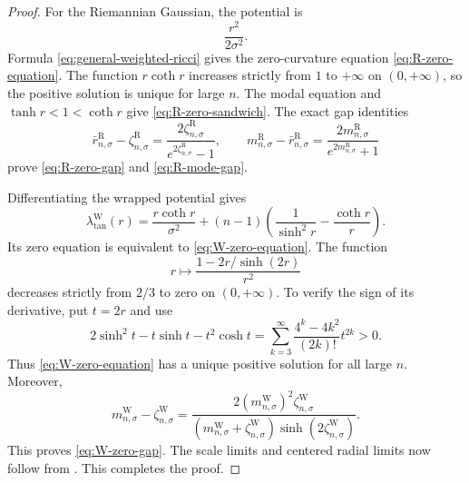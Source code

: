 \documentclass[10pt,a4paper]{amsart}
\begin{document}
\begin{proof}
	For the Riemannian Gaussian, the potential is
	\[
		\frac{r^2}{2\sigma^2}.
	\]
	Formula \eqref{eq:general-weighted-ricci} gives the zero-curvature equation
	\eqref{eq:R-zero-equation}.  The function $r\coth r$ increases strictly
	from $1$ to $+\infty$ on $(0,+\infty)$, so the positive solution is
	unique for large $n$.  The modal equation and
	$\tanh r<1<\coth r$ give \eqref{eq:R-zero-sandwich}.  The exact gap
	identities
	\[
		\bar r^{\mathrm R}_{n,\sigma}
		-\zeta^{\mathrm R}_{n,\sigma}
		=
		\frac{2\zeta^{\mathrm R}_{n,\sigma}}
		{e^{2\zeta^{\mathrm R}_{n,\sigma}}-1},
		\qquad
		m^{\mathrm R}_{n,\sigma}
		-\bar r^{\mathrm R}_{n,\sigma}
		=
		\frac{2m^{\mathrm R}_{n,\sigma}}
		{e^{2m^{\mathrm R}_{n,\sigma}}+1}
	\]
	prove \eqref{eq:R-zero-gap} and \eqref{eq:R-mode-gap}.

	Differentiating the wrapped potential gives
	\[
		\lambda^{\mathrm W}_{\mathrm{tan}}(r)
		=
		\frac{r\coth r}{\sigma^2}
		+(n-1)\left(
		\frac1{\sinh^2r}-\frac{\coth r}{r}\right).
	\]
	Its zero equation is equivalent to \eqref{eq:W-zero-equation}.  The
	function
\[ r\longmapsto \frac{1-2r/\sinh(2r)}{r^2} \]
	decreases strictly from $2/3$ to zero on $(0,+\infty)$.  To verify the
	sign of its derivative, put $t=2r$ and use
\[ 2\sinh^2t-t\sinh t-t^2\cosh t = \sum_{k=3}^{\infty} \frac{4^k-4k^2}{(2k)!}t^{2k}>0. \]
	Thus \eqref{eq:W-zero-equation} has a unique positive solution for all
	large $n$.  Moreover,
	\[
		m^{\mathrm W}_{n,\sigma}-\zeta^{\mathrm W}_{n,\sigma}
		=
		\frac{
		2(m^{\mathrm W}_{n,\sigma})^2
		\zeta^{\mathrm W}_{n,\sigma}}
		{(m^{\mathrm W}_{n,\sigma}
		+\zeta^{\mathrm W}_{n,\sigma})
		\sinh(2\zeta^{\mathrm W}_{n,\sigma})}.
	\]
	This proves \eqref{eq:W-zero-gap}.  The scale limits and centered radial
	limits now follow from .
	This completes the proof.
\end{proof}
\end{document}
